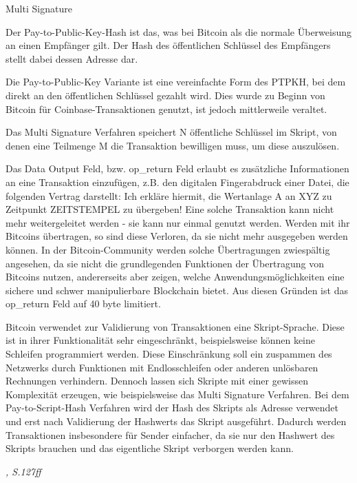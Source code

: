 \begin{labeling}{Multi Signature}
	\item[P2PKH] Der Pay-to-Public-Key-Hash ist das, was bei Bitcoin als die normale Überweisung an einen Empfänger gilt. Der Hash des öffentlichen Schlüssel des Empfängers stellt dabei dessen Adresse dar.
	\item[PTPK] Die Pay-to-Public-Key Variante ist eine vereinfachte Form des PTPKH, bei dem direkt an den öffentlichen Schlüssel gezahlt wird. Dies wurde zu Beginn von Bitcoin für Coinbase-Transaktionen genutzt, ist jedoch mittlerweile veraltet.
	\item[Multi Signature] Das Multi Signature Verfahren speichert N öffentliche Schlüssel im Skript, von denen eine Teilmenge M die Transaktion bewilligen muss, um diese auszulösen.
	\item[Data Output] Das Data Output Feld, bzw. op\_return Feld erlaubt es zusätzliche Informationen an eine Transaktion einzufügen, z.B. den digitalen Fingerabdruck einer Datei, die folgenden Vertrag darstellt: \glqq Ich erkläre hiermit, die Wertanlage A an XYZ zu Zeitpunkt ZEITSTEMPEL zu übergeben!\grqq{} Eine solche Transaktion kann nicht mehr weitergeleitet werden - sie kann nur einmal genutzt werden. Werden mit ihr Bitcoins übertragen, so sind diese Verloren, da sie nicht mehr ausgegeben werden können.  In der Bitcoin-Community werden solche Übertragungen zwiespältig angesehen, da sie nicht die grundlegenden Funktionen der Übertragung von Bitcoins nutzen, andererseits aber zeigen, welche Anwendungsmöglichkeiten eine sichere und schwer manipulierbare Blockchain bietet. Aus diesen Gründen ist das op\_return Feld auf 40 byte limitiert. 
	\item[P2SH] Bitcoin verwendet zur Validierung von Transaktionen eine Skript-Sprache. Diese ist in ihrer Funktionalität sehr eingeschränkt, beispielsweise können keine Schleifen programmiert werden. Diese Einschränkung soll ein zuspammen des Netzwerks durch Funktionen mit Endlosschleifen oder anderen unlösbaren Rechnungen verhindern. Dennoch lassen sich Skripte mit einer gewissen Komplexität erzeugen, wie beispielsweise das Multi Signature Verfahren. Bei dem Pay-to-Script-Hash Verfahren wird der Hash des Skripts als Adresse verwendet und erst nach Validierung der Hashwerts das Skript ausgeführt. Dadurch werden Transaktionen insbesondere für Sender einfacher, da sie nur den Hashwert des Skripts brauchen und das eigentliche Skript verborgen werden kann.
\end{labeling}
\textit{\cite{Antonopoulos.2015}, S.127ff}
